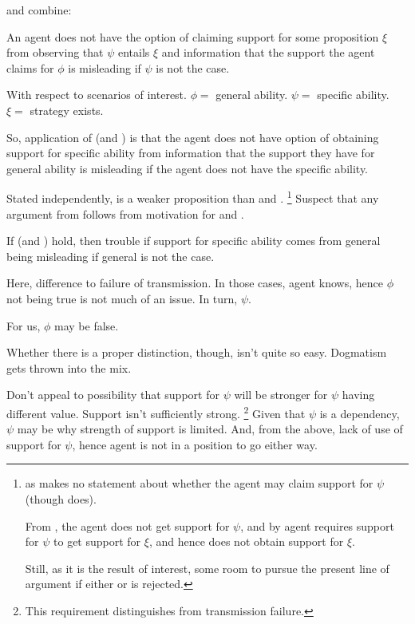 \begin{note}[Combination]
  \nI{} and \nIm{} combine:

  \begin{proposition}[\nIp{}]
    An agent does not have the option of claiming support for some proposition \(\xi\) from observing that \(\psi\) entails \(\xi\) and information that the support the agent claims for \(\phi\) is misleading if \(\psi\) is not the case.
  \end{proposition}

  With respect to scenarios of interest.
    \(\phi = \) general ability.
    \(\psi = \) specific ability.
    \(\xi = \) strategy exists.

    So, application of \nI{} (and \nIm{}) is that the agent does not have option of obtaining support for specific ability from information that the support they have for general ability is misleading if the agent does not have the specific ability.

    Stated independently, \nIp{} is a weaker proposition than \nI{} and \nIm{}.\nolinebreak
    \footnote{
      as \nIp{} makes no statement about whether the agent may claim support for \(\psi\) (though \nI{} does).

      From \nI{}, the agent does not get support for \(\psi\), and by \nIm{} agent requires support for \(\psi\) to get support for \(\xi\), and hence does not obtain support for \(\xi\).

    Still, as it is the result of interest, some room to pursue the present line of argument if either \nI{} or \nIm{} is rejected.
    }
    Suspect that any argument from \nIp{} follows from motivation for \nI{} and \nIm{}.

  If \nI{} (and \nIm{}) hold, then trouble if support for specific ability comes from general being misleading if general is not the case.
\end{note}


\begin{note}
  Here, difference to failure of transmission.
  In those cases, agent knows, hence \(\phi\) not being true is not much of an issue.
  In turn, \(\psi\).

  For us, \(\phi\) may be false.

  Whether there is a proper distinction, though, isn't quite so easy.
  Dogmatism gets thrown into the mix.
\end{note}


\begin{note}
  Don't appeal to possibility that support for \(\psi\) will be stronger for \(\psi\) having different value.
  Support isn't sufficiently strong.\nolinebreak
  \footnote{
    This requirement distinguishes from transmission failure.
  }
  Given that \(\psi\) is a dependency, \(\psi\) may be why strength of support is limited.
  And, from the above, lack of use of support for \(\psi\), hence agent is not in a position to go either way.
\end{note}